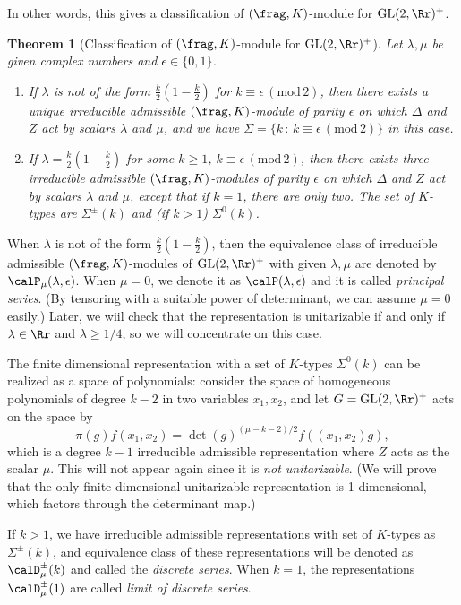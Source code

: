 \documentclass{article}
\newtheorem{theorem}{Theorem}[section]
\newcommand{\GL}{\mathrm{GL}}
\newcommand{\Mod}[1]{\,(\mathrm{mod}\,#1)}
\begin{document}
In other words, this gives a classification of $(\frag, K)$-module for $\GL(2, \Rr)^{+}$. 
\begin{theorem}[Classification of $(\frag, K)$-module for $\GL(2, \Rr)^{+}$]
Let $\lambda, \mu$ be given complex numbers and $\epsilon \in \{0, 1\}$. 
\begin{enumerate}
\item If $\lambda$ is not of the form $\frac{k}{2}\left( 1- \frac{k}{2}\right)$ for $k\equiv \epsilon \Mod{2}$, then there exists a unique irreducible admissible $(\frag, K)$-module of parity $\epsilon$ on which $\Delta$ and $Z$ act by scalars $\lambda$ and $\mu$, and we have $\Sigma = \{k\,:\, k\equiv \epsilon\Mod{2}\}$ in this case. 
\item If $\lambda = \frac{k}{2}\left( 1 - \frac{k}{2} \right)$ for some $k\geq 1$, $k\equiv \epsilon\Mod{2}$, then there exists three irreducible admissible  $(\frag, K)$-modules of parity $\epsilon$ on which $\Delta$ and $Z$ act by scalars $\lambda$ and $\mu$, except that if $k = 1$, there are only two. 
The set of $K$-types are $\Sigma ^{\pm}(k)$ and (if $k>1$) $\Sigma^{0}(k)$. 
\end{enumerate}
\end{theorem}
When $\lambda$ is not of the form $\frac{k}{2}\left(1-\frac{k}{2}\right)$, then the equivalence class of irreducible admissible $(\frag, K)$-modules of $\GL(2, \Rr)^{+}$ with given $\lambda, \mu$ are denoted by $\calP_{\mu}(\lambda, \epsilon)$. When $\mu = 0$, we denote it as $\calP(\lambda, \epsilon)$ and it is called \emph{principal series}. (By tensoring with a suitable power of determinant, we can assume $\mu = 0$ easily.) Later, we wiil check that the representation is unitarizable if and only if $\lambda\in \Rr$ and $\lambda \geq 1/4$, so we will concentrate on this case. 

The finite dimensional representation with a set of $K$-types $\Sigma^{0}(k)$ can be realized as a space of polynomials: consider the space of homogeneous polynomials of degree $k-2$ in two variables $x_{1}, x_{2}$, and let $G = \GL(2, \Rr)^{+}$ acts on the space by 
$$
\pi(g)f(x_{1}, x_{2}) = \det(g)^{(\mu-k-2)/2} f((x_{1}, x_{2})g),
$$
which is a degree $k-1$ irreducible admissible representation where $Z$ acts as the scalar $\mu$. 
This will not appear again since it is \emph{not unitarizable}. (We will prove that the only finite dimensional unitarizable representation is 1-dimensional, which factors through the determinant map.)

If $k>1$, we have irreducible admissible representations with set of $K$-types as $\Sigma^{\pm}(k)$, and equivalence class of these representations will be denoted as $\calD^{\pm}_{\mu}(k)$ and called the \emph{discrete series}. When $k = 1$, the representations $\calD_{\mu}^{\pm}(1)$ are called \emph{limit of discrete series}. 
\end{document}

